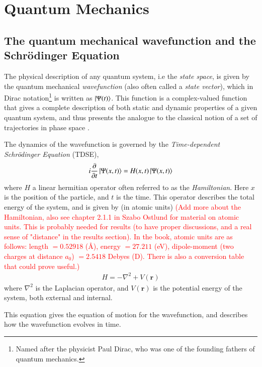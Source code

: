 \documentclass{subfiles}
\begin{document}
\section{Quantum Mechanics}
\subsection*{The quantum mechanical wavefunction and the Schrödinger Equation}
The physical description of any quantum system, i.e the \emph{state space}, is given by the quantum mechanical \emph{wavefunction} (also often called a \emph{state vector})\cite{nielsen2010quantum}, which in Dirac notation\footnote{Named after the physicist Paul Dirac, who was one of the founding fathers of quantum mechanics.} is written as $\ket{\Psi(t)}$. 
This function is a complex-valued function that gives a complete description of both static and dynamic properties of a given quantum system, and thus presents the analogue to the classical notion of a set of trajectories in phase space \cite{hochstuhl2014time}. 

The dynamics of the wavefunction is governed by the \emph{Time-dependent Schrödinger Equation} (TDSE),
\begin{equation}
    i\frac{\partial}{\partial t}\ket{\Psi(x, t)} = H(x,t)\ket{\Psi(x, t)}\label{eq:tdse}
\end{equation}
where $H$ a linear hermitian operator often referred to as the \emph{Hamiltonian}. Here $x$ is the position of the particle, and $t$ is the time. 
This operator describes the total energy of the system, and is given by (in atomic units) \textcolor{red}{(Add more about the Hamiltonian, also see chapter 2.1.1 in Szabo Ostlund for material on atomic units. This is probably needed for results (to have proper discussions, and a real sense of "distance" in the results section). In the book, atomic units are as follows: length $=0.52918$ (Å), energy $=27.211$ (eV), dipole-moment (two charges at distance $a_0$) $=2.5418$ Debyes (D). There is also a conversion table that could prove useful.)}
\begin{align*}
    H = -\nabla^2 + V(\mathbf{r})
\end{align*}
where $\nabla^2$ is the Laplacian operator, and $V(\mathbf{r})$ is the potential energy of the system, both external and internal.


This equation gives the equation of motion for the wavefunction, and describes how the wavefunction evolves in time.
\end{document}
